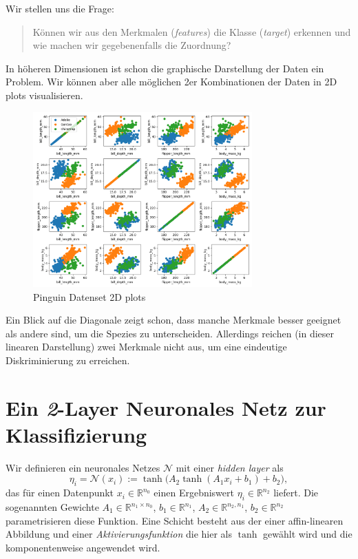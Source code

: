 \documentclass[
]{book}
\theoremstyle{definition}
\theoremstyle{definition}
\theoremstyle{definition}
\theoremstyle{definition}
\theoremstyle{remark}
\begin{document}
Wir stellen uns die Frage:

\begin{quote}
Können wir aus den Merkmalen (\emph{features}) die Klasse (\emph{target}) erkennen und wie machen wir gegebenenfalls die Zuordnung?
\end{quote}

In höheren Dimensionen ist schon die graphische Darstellung der Daten ein Problem. Wir können aber alle möglichen 2er Kombinationen der Daten in 2D plots visualisieren.

\begin{figure}
\hypertarget{fig:05-penguin-allpairs}{%
\centering
\includegraphics[width=0.75\textwidth,height=\textheight]{bilder/05-all-pairs.png}
\caption{Pinguin Datenset 2D plots}\label{fig:05-penguin-allpairs}
}
\end{figure}

Ein Blick auf die Diagonale zeigt schon, dass manche Merkmale besser geeignet als andere sind, um die Spezies zu unterscheiden. Allerdings reichen (in dieser linearen Darstellung) zwei Merkmale nicht aus, um eine eindeutige Diskriminierung zu erreichen.

\hypertarget{ein-2-layer-neuronales-netz-zur-klassifizierung}{%
\section{\texorpdfstring{Ein \emph{2}-Layer Neuronales Netz zur Klassifizierung}{Ein 2-Layer Neuronales Netz zur Klassifizierung}}\label{ein-2-layer-neuronales-netz-zur-klassifizierung}}

Wir definieren ein neuronales Netzes \(\mathcal N\) mit einer \emph{hidden layer} als
\begin{equation*}
\eta_i = \mathcal N (x_i):=\tanh \bigl (A_2 \tanh (A_1 x_i + b_1) + b_2\bigr ),
\end{equation*}
das für einen Datenpunkt \(x_i \in \mathbb R^{n_0}\) einen Ergebniswert \(\eta_i\in \mathbb R^{n_2}\) liefert.
Die sogenannten Gewichte \(A_1 \in \mathbb R^{n_1 \times n_0}\), \(b_1 \in \mathbb R^{n_1}\), \(A_2 \in \mathbb R^{n_2, n_1}\), \(b_2 \in \mathbb R^{n_2}\) parametrisieren diese Funktion. Eine Schicht besteht aus der einer affin-linearen Abbildung und einer \emph{Aktivierungsfunktion} die hier als \(\tanh\) gewählt wird und die komponentenweise angewendet wird.
\end{document}
